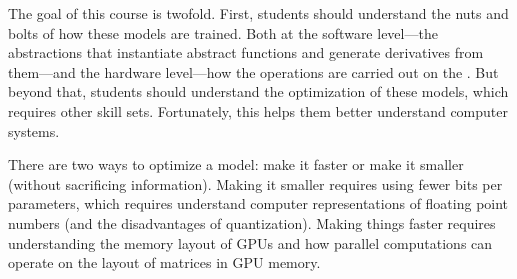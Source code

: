The goal of this course is twofold.  First, students should understand the nuts and bolts of how these models are trained.  Both at the software level---the abstractions that instantiate abstract functions and generate derivatives from them---and the hardware level---how the operations are carried out on the .  But beyond that, students should understand the optimization of these models, which requires other skill sets.  Fortunately, this helps them better understand computer systems.

There are two ways to optimize a model: make it faster or make it smaller (without sacrificing information).  Making it smaller requires using fewer bits per parameters, which requires understand computer representations of floating point numbers (and the disadvantages of quantization).  Making things faster requires understanding the memory layout of GPUs and how parallel computations can operate on the layout of matrices in GPU memory.


